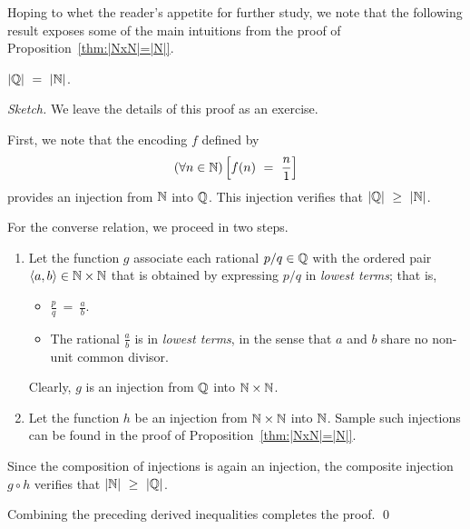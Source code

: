 \smallskip

\hspace*{.35in}{\em the set $\N$ has the same cardinality as the set $\Q$.}

\smallskip

\noindent
Hoping to whet the reader's appetite for further study, we note that the following result exposes some of the main intuitions from the proof of Proposition~\ref{thm:|NxN|=|N|}.

\begin{prop}
\label{thm:|Q|=|N|}
$|\mathbb{Q}| \ = \ |\mathbb{N}|$.
\end{prop}

\begin{proof}[Sketch]
We leave the details of this proof as an exercise.

\smallskip

First, we note that the encoding $f$ defined by
\[ (\forall n \in \N) \left[ f(n) \ = \ \frac{n}{1} \right] \]
provides an injection from $\N$ into $\Q$.  This injection verifies that $|\mathbb{Q}| \ \geq \ |\mathbb{N}|$.

\smallskip

For the converse relation, we proceed in two steps.
\begin{enumerate}
\item
Let the function $g$ associate each rational $p/q \in \mathbb{Q}$ with the ordered pair $\langle a, b \rangle \in \mathbb{N} \times \mathbb{N}$ that is obtained by expressing $p/q$ in {\em lowest terms}; that is,
  \begin{itemize}
  \item
$\displaystyle \frac{p}{q} \ = \ \frac{a}{b}$.
  \medskip\item
The rational $\displaystyle \frac{a}{b}$ is in {\em lowest terms}, in the sense that $a$ and $b$ share no non-unit common divisor.
  \end{itemize}
Clearly, $g$ is an injection from $\Q$ into $\mathbb{N} \times \mathbb{N}$.

\medskip\item
Let the function $h$ be an injection from $\mathbb{N} \times \mathbb{N}$ into $\N$.  Sample such injections can be found in the proof of Proposition~\ref{thm:|NxN|=|N|}.
\end{enumerate}
Since the composition of injections is again an injection, the composite injection $g \circ h$ verifies that $|\mathbb{N}| \ \geq \ |\mathbb{Q}|$.

\smallskip

Combining the preceding derived inequalities completes the proof.
\qed
\end{proof}


